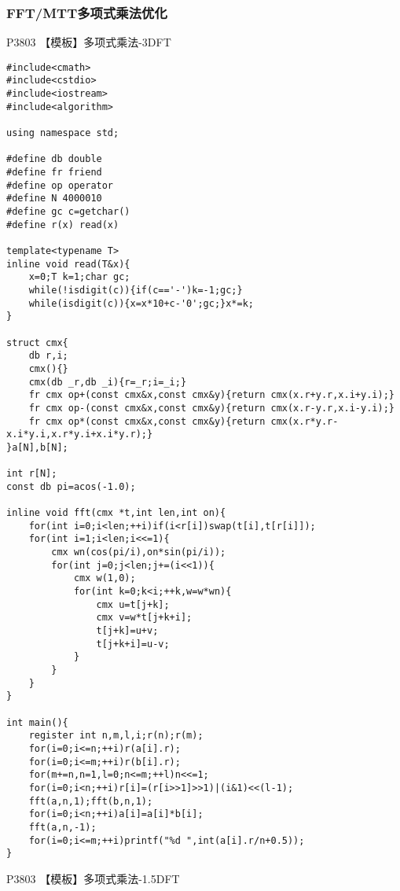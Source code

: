 \documentclass{ctexart}
\begin{document}
\subsubsection{FFT/MTT多项式乘法优化}
P3803 【模板】多项式乘法-3DFT
\begin{lstlisting}
#include<cmath>
#include<cstdio>
#include<iostream>
#include<algorithm>

using namespace std;

#define db double
#define fr friend
#define op operator
#define N 4000010
#define gc c=getchar()
#define r(x) read(x)

template<typename T>
inline void read(T&x){
    x=0;T k=1;char gc;
    while(!isdigit(c)){if(c=='-')k=-1;gc;}
    while(isdigit(c)){x=x*10+c-'0';gc;}x*=k;
}

struct cmx{
    db r,i;
    cmx(){}
    cmx(db _r,db _i){r=_r;i=_i;}
    fr cmx op+(const cmx&x,const cmx&y){return cmx(x.r+y.r,x.i+y.i);}
    fr cmx op-(const cmx&x,const cmx&y){return cmx(x.r-y.r,x.i-y.i);}
    fr cmx op*(const cmx&x,const cmx&y){return cmx(x.r*y.r-x.i*y.i,x.r*y.i+x.i*y.r);}
}a[N],b[N];

int r[N];
const db pi=acos(-1.0);

inline void fft(cmx *t,int len,int on){
    for(int i=0;i<len;++i)if(i<r[i])swap(t[i],t[r[i]]);
    for(int i=1;i<len;i<<=1){
        cmx wn(cos(pi/i),on*sin(pi/i));
        for(int j=0;j<len;j+=(i<<1)){
            cmx w(1,0);
            for(int k=0;k<i;++k,w=w*wn){
                cmx u=t[j+k];
                cmx v=w*t[j+k+i];
                t[j+k]=u+v;
                t[j+k+i]=u-v;
            }
        }
    }
}

int main(){
    register int n,m,l,i;r(n);r(m);
    for(i=0;i<=n;++i)r(a[i].r);
    for(i=0;i<=m;++i)r(b[i].r);
    for(m+=n,n=1,l=0;n<=m;++l)n<<=1;
    for(i=0;i<n;++i)r[i]=(r[i>>1]>>1)|(i&1)<<(l-1);
    fft(a,n,1);fft(b,n,1);
    for(i=0;i<n;++i)a[i]=a[i]*b[i];
    fft(a,n,-1);
    for(i=0;i<=m;++i)printf("%d ",int(a[i].r/n+0.5));
}
\end{lstlisting}
P3803 【模板】多项式乘法-1.5DFT
\end{document}
